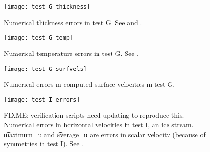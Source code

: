 \begin{figure}[ht]
\centering
\texttt{[image: test-G-thickness]}
\caption{Numerical thickness errors in test G.  See \cite{BBL} and \cite{BLKCB}.}
\label{fig:thickerrsG}
\end{figure}

\begin{figure}[ht]
\centering
\texttt{[image: test-G-temp]}
\caption{Numerical temperature errors in test G. See \cite{BBL}.}
\label{fig:temperrsG}
\end{figure}

\begin{figure}[ht]
\centering
\texttt{[image: test-G-surfvels]}
\caption{Numerical errors in computed surface velocities in test G.}
\label{fig:surfvelerrsG}
\end{figure}

\begin{figure}[ht]
\centering
\texttt{[image: test-I-errors]}
\caption{FIXME:  verification scripts need updating to reproduce this.  Numerical errors in horizontal velocities in test I, an ice stream. \t{maximum_u} and \t{average_u} are errors in scalar velocity (because of symmetries in test I).  See \cite{SchoofStream,BBssasliding}.}
\label{fig:velerrsI}
\end{figure}



